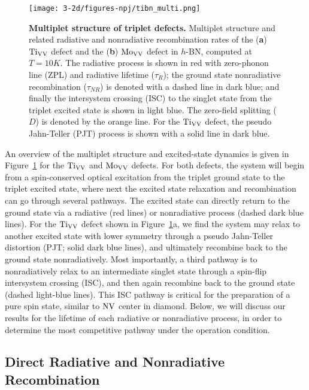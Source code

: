 \begin{figure}[H]
    \centering
    \texttt{[image: 3-2d/figures-npj/tibn\_multi.png]}
    \caption{
         \textbf{Multiplet structure of triplet defects.}
        Multiplet structure and related radiative and nonradiative recombination rates of the (\textbf{a}) $\text{Ti}_{\text{V}\text{V}}$ defect and the (\textbf{b}) $\text{Mo}_{\text{V}\text{V}}$ defect in $h$-BN, computed at $T=10K$.
    The radiative process is shown in red with zero-phonon line (ZPL) and radiative lifetime ($\tau_R$); the ground state nonradiative recombination ($\tau_{NR}$) is denoted with a dashed line in dark blue; and finally the intersystem crossing (ISC) to the singlet state from the triplet excited state is shown in light blue. The zero-field splitting ($D$) is denoted by the orange line. For the $\text{Ti}_{\text{V}\text{V}}$ defect, the pseudo Jahn-Teller (PJT) process is shown with a solid line in dark blue.
   }
    \label{fig:multi}
\end{figure}

An overview of the multiplet structure and excited-state dynamics is given in Figure~\ref{fig:multi} for the $\text{Ti}_{\text{V}\text{V}}$ and $\text{Mo}_{\text{V}\text{V}}$ defects.
For both defects, the system will begin from a spin-conserved optical excitation from the triplet ground state to the triplet excited state, where next the excited state relaxation and recombination can go through several pathways. The excited state can directly return to the ground state via a radiative (red lines) or nonradiative process (dashed dark blue lines). For the $\text{Ti}_{\text{V}\text{V}}$ defect shown in Figure~\ref{fig:multi}a, we find the system may relax to another excited state with lower symmetry through a pseudo Jahn-Teller distortion (PJT; solid dark blue lines), and ultimately recombine back to the ground state nonradiatively. Most importantly, a third pathway is to nonradiatively relax to an intermediate singlet state through a spin-flip intersystem crossing (ISC), and then again recombine back to the ground state (dashed light-blue lines).
This ISC pathway is critical for the preparation of a pure spin state, similar to $\text{NV}$ center in diamond.
Below, we will discuss our results for the lifetime of each radiative or nonradiative process, in order to determine the most competitive pathway under the operation condition.

\subsection{Direct Radiative and Nonradiative Recombination}


